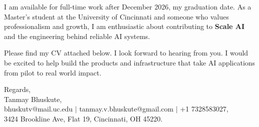 \documentclass[11pt]{letter}
\begin{document}
\begin{letter}{}
I am available for full-time work after December 2026, my graduation date. As a Master's student at the University of Cincinnati and someone who values professionalism and growth, I am enthusiastic about contributing to \textbf{Scale AI} and the engineering behind reliable AI systems.

Please find my CV attached below. I look forward to hearing from you. I would be excited to help build the products and infrastructure that take AI applications from pilot to real world impact.

{\setlength{\parskip}{0pt}
Regards,\\
Tanmay Bhuskute,\\
bhuskutv@mail.uc.edu $\mid$ tanmay.v.bhuskute@gmail.com $\mid$ +1 7328583027,\\
3424 Brookline Ave, Flat 19, Cincinnati, OH 45220.
}

\end{letter}
\end{document}
